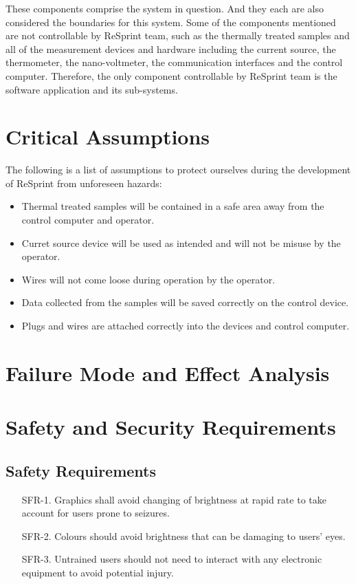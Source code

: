 \documentclass{article}
\begin{document}
\noindent These components comprise the system in question. And they each are also considered the boundaries for this system. Some of the components mentioned are not controllable by ReSprint team, such as the thermally treated samples and all of the measurement devices and hardware including the current source, the thermometer, the nano-voltmeter, the communication interfaces and the control computer. Therefore, the only component controllable by ReSprint team is the software application and its sub-systems.

\section{Critical Assumptions}

\noindent The following is a list of assumptions to protect ourselves during the development of ReSprint from unforeseen hazards:

\begin{itemize}
  \item Thermal treated samples will be contained in a safe area away from the control computer and operator. 
  \item Curret source device will be used as intended and will not be misuse by the operator.
  \item Wires will not come loose during operation by the operator.
  \item Data collected from the samples will be saved correctly on the control device.
  \item Plugs and wires are attached correctly into the devices and control computer.
\end{itemize}

\section{Failure Mode and Effect Analysis}


\section{Safety and Security Requirements}

\subsection*{Safety Requirements}
\begin{enumerate}
  \item[SFR-1.] Graphics shall avoid changing of brightness at rapid rate to take account for users prone to seizures.\\
  \item[SFR-2.] Colours should avoid brightness that can be damaging to users' eyes.\\
  \item[SFR-3.] Untrained users should not need to interact with any electronic equipment to avoid potential injury.\\
\end{enumerate}
\end{document}
